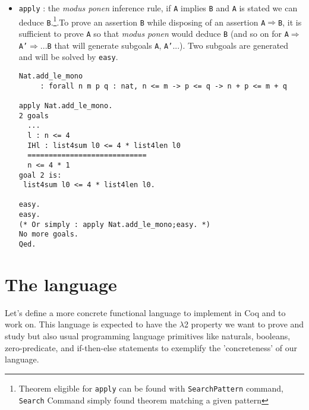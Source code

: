 \documentclass{article}
\begin{document}
\begin{itemize}
\begin{verbatim}
rewrite Nat.mul_add_distr_l.
  ...
  ============================
  n + list4sum l0 <= 4 * 1 + 4 * list4len l0\end{verbatim}
            \item \texttt{apply} : the \textit{modus ponen} inference rule, if \texttt{A} implies \texttt{B} and \texttt{A} is stated we can deduce \texttt{B}.\footnote{Theorem eligible for \texttt{apply} can be found with \texttt{SearchPattern} command, \texttt{Search} Command simply found theorem matching a given pattern}.To prove an assertion \texttt{B} while disposing of an assertion \texttt{A}$\Rightarrow$\texttt{B}, it is sufficient to prove \texttt{A} so that \textit{modus ponen} would deduce \texttt{B} (and so on for \texttt{A}$\Rightarrow$\texttt{A'}$\Rightarrow$...\texttt{B} that will generate subgoals \texttt{A}, \texttt{A'}...). Two subgoals are generated and will be solved by \texttt{easy}.
            \begin{verbatim}Nat.add_le_mono
     : forall n m p q : nat, n <= m -> p <= q -> n + p <= m + q
     
apply Nat.add_le_mono.
2 goals
  ...
  l : n <= 4
  IHl : list4sum l0 <= 4 * list4len l0
  ============================
  n <= 4 * 1
goal 2 is:
 list4sum l0 <= 4 * list4len l0.

easy.
easy.
(* Or simply : apply Nat.add_le_mono;easy. *)
No more goals.
Qed. \end{verbatim}
        \end{itemize}
        
\section{The language}
    Let's define a more concrete functional language to implement in Coq and to work on. This language is expected to have the $\lambda$2 property we want to prove and study but also usual programming language primitives like naturals, booleans, zero-predicate, and if-then-else statements to exemplify the 'concreteness' of our language.
    
\end{document}
